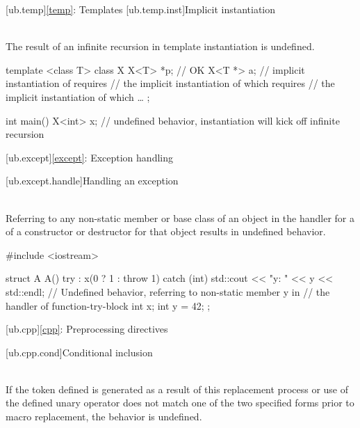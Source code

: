 [ub.temp]{\ref{temp}: Templates}
[ub.temp.inst]{Implicit instantiation}

\pnum
{} \\
The result of an infinite recursion in template instantiation is undefined.

\pnum
\begin{example}
\begin{codeblock}
template <class T>
class X {
  X<T> *p;      // OK
  X<T *> a;     // implicit instantiation of  requires
                // the implicit instantiation of  which requires
                // the implicit instantiation of  which \ldots
};

int main() {
  X<int> x;     // undefined behavior, instantiation will kick off infinite recursion
}
\end{codeblock}
\end{example}


[ub.except]{\ref{except}: Exception handling}

[ub.except.handle]{Handling an exception}

\pnum
{} \\
Referring to any non-static member or base class of an object in the handler for a   of a
constructor or destructor for that object results in undefined behavior.

\pnum
\begin{example}
\begin{codeblock}
#include <iostream>

struct A {
  A() try : x(0 ? 1 : throw 1) {
  } catch (int) {
    std::cout << "y: " << y << std::endl;   // Undefined behavior, referring to non-static member y in
                                            // the handler of function-try-block
  }
  int x;
  int y = 42;
};
\end{codeblock}
\end{example}


[ub.cpp]{\ref{cpp}: Preprocessing directives}

[ub.cpp.cond]{Conditional inclusion}

\pnum
{} \\
If the token defined is generated as a result of this replacement process or use of
the defined unary operator does not match one of the two specified forms prior to macro replacement, the
behavior is undefined.

